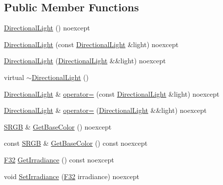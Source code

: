 \subsection*{Public Member Functions}
\begin{DoxyCompactItemize}
\item 
\hyperlink{classmage_1_1rendering_1_1_directional_light_a5a8c05a640ec86f4d1994d687de6415f}{Directional\+Light} () noexcept
\item 
\hyperlink{classmage_1_1rendering_1_1_directional_light_a95bac0f10225523a7aaf7d17503f6a5f}{Directional\+Light} (const \hyperlink{classmage_1_1rendering_1_1_directional_light}{Directional\+Light} \&light) noexcept
\item 
\hyperlink{classmage_1_1rendering_1_1_directional_light_aa8ff1e6487160eb851cc2c393be9ab6a}{Directional\+Light} (\hyperlink{classmage_1_1rendering_1_1_directional_light}{Directional\+Light} \&\&light) noexcept
\item 
virtual \hyperlink{classmage_1_1rendering_1_1_directional_light_a0f35f25f86aeb2ae688a8918fa3d8b76}{$\sim$\+Directional\+Light} ()
\item 
\hyperlink{classmage_1_1rendering_1_1_directional_light}{Directional\+Light} \& \hyperlink{classmage_1_1rendering_1_1_directional_light_aa81fa39a4d068d879a6d90587ee324d8}{operator=} (const \hyperlink{classmage_1_1rendering_1_1_directional_light}{Directional\+Light} \&light) noexcept
\item 
\hyperlink{classmage_1_1rendering_1_1_directional_light}{Directional\+Light} \& \hyperlink{classmage_1_1rendering_1_1_directional_light_abcb7fb355a9d3004fd2f9b597b6166d2}{operator=} (\hyperlink{classmage_1_1rendering_1_1_directional_light}{Directional\+Light} \&\&light) noexcept
\item 
\hyperlink{structmage_1_1_s_r_g_b}{S\+R\+GB} \& \hyperlink{classmage_1_1rendering_1_1_directional_light_aa48f4fbdc75927aa30638d5fe2cfa2f2}{Get\+Base\+Color} () noexcept
\item 
const \hyperlink{structmage_1_1_s_r_g_b}{S\+R\+GB} \& \hyperlink{classmage_1_1rendering_1_1_directional_light_a37f94364981c5300dc127e8e55a471d8}{Get\+Base\+Color} () const noexcept
\item 
\hyperlink{namespacemage_aa97e833b45f06d60a0a9c4fc22ae02c0}{F32} \hyperlink{classmage_1_1rendering_1_1_directional_light_a1cba2b0099366af146c3ccf364946bf8}{Get\+Irradiance} () const noexcept
\item 
void \hyperlink{classmage_1_1rendering_1_1_directional_light_af8570b18bfb807492317e4a98f5c7ba6}{Set\+Irradiance} (\hyperlink{namespacemage_aa97e833b45f06d60a0a9c4fc22ae02c0}{F32} irradiance) noexcept

\end{DoxyCompactItemize}
